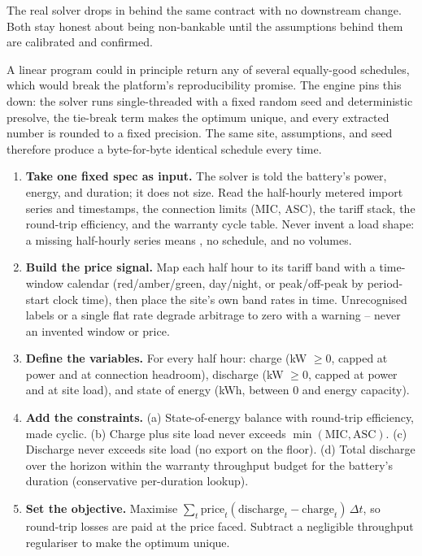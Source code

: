 The real solver drops in behind the same contract with no downstream change. Both stay honest about being non-bankable until the assumptions behind them are calibrated and confirmed.

\begin{plainnote}
A linear program could in principle return any of several equally-good schedules, which would break the platform's reproducibility promise. The engine pins this down: the solver runs single-threaded with a fixed random seed and deterministic presolve, the tie-break term makes the optimum unique, and every extracted number is rounded to a fixed precision. The same site, assumptions, and seed therefore produce a byte-for-byte identical schedule every time.
\end{plainnote}

\begin{rebuild}
\begin{enumerate}
  \item \textbf{Take one fixed spec as input.} The solver is told the battery's power, energy, and duration; it does not size. Read the half-hourly metered import series and timestamps, the connection limits (MIC, ASC), the tariff stack, the round-trip efficiency, and the warranty cycle table. Never invent a load shape: a missing half-hourly series means , no schedule, and no volumes.
  \item \textbf{Build the price signal.} Map each half hour to its tariff band with a time-window calendar (red/amber/green, day/night, or peak/off-peak by period-start clock time), then place the site's own band rates in time. Unrecognised labels or a single flat rate degrade arbitrage to zero with a warning -- never an invented window or price.
  \item \textbf{Define the variables.} For every half hour: charge (kW $\ge 0$, capped at power and at connection headroom), discharge (kW $\ge 0$, capped at power and at site load), and state of energy (kWh, between 0 and energy capacity).
  \item \textbf{Add the constraints.} (a) State-of-energy balance with round-trip efficiency, made cyclic. (b) Charge plus site load never exceeds $\min(\text{MIC}, \text{ASC})$. (c) Discharge never exceeds site load (no export on the floor). (d) Total discharge over the horizon within the warranty throughput budget for the battery's duration (conservative per-duration lookup).
  \item \textbf{Set the objective.} Maximise $\sum_t \text{price}_t (\text{discharge}_t - \text{charge}_t)\,\Delta t$, so round-trip losses are paid at the price faced. Subtract a negligible throughput regulariser to make the optimum unique.

\end{enumerate}
\end{rebuild}

